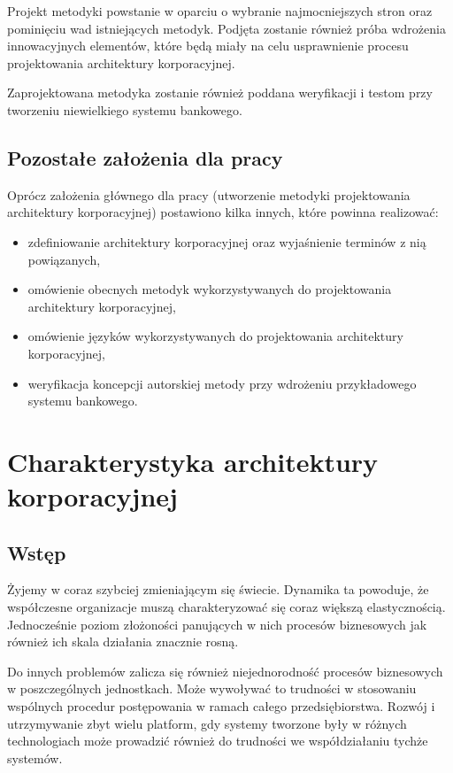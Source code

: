 Projekt metodyki powstanie w oparciu o wybranie najmocniejszych stron oraz pominięciu wad istniejących metodyk. Podjęta zostanie również próba wdrożenia innowacyjnych elementów, które będą miały na celu usprawnienie procesu projektowania architektury korporacyjnej.

Zaprojektowana metodyka zostanie również poddana weryfikacji i testom przy tworzeniu niewielkiego systemu bankowego.

\section{Pozostałe założenia dla pracy}
Oprócz założenia głównego dla pracy (utworzenie metodyki projektowania architektury korporacyjnej) postawiono kilka innych, które powinna realizować:
\begin{itemize}
\item{zdefiniowanie architektury korporacyjnej oraz wyjaśnienie terminów z nią powiązanych,}
\item{omówienie obecnych metodyk wykorzystywanych do projektowania architektury korporacyjnej,}
\item{omówienie języków wykorzystywanych do projektowania architektury korporacyjnej,}
\item{weryfikacja koncepcji autorskiej metody przy wdrożeniu przykładowego systemu bankowego.}
\end{itemize}

\chapter{Charakterystyka architektury korporacyjnej}

\section{Wstęp}
Żyjemy w coraz szybciej zmieniającym się świecie. Dynamika ta powoduje, że współczesne organizacje muszą charakteryzować się coraz większą elastycznością. Jednocześnie poziom złożoności panujących w nich procesów biznesowych jak również ich skala działania znacznie rosną.\cite{SobArchKorpDobrPr}

Do innych problemów zalicza się również niejednorodność procesów biznesowych w poszczególnych jednostkach. Może wywoływać to trudności w stosowaniu wspólnych procedur postępowania w ramach całego przedsiębiorstwa. Rozwój i utrzymywanie zbyt wielu platform, gdy systemy tworzone były w różnych technologiach może prowadzić również do trudności we współdziałaniu tychże systemów.

